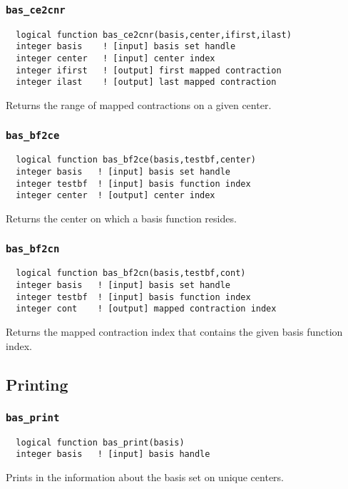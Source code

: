 \subsubsection{{\tt bas\_ce2cnr}}
\begin{verbatim}
  logical function bas_ce2cnr(basis,center,ifirst,ilast)
  integer basis    ! [input] basis set handle         
  integer center   ! [input] center index 
  integer ifirst   ! [output] first mapped contraction
  integer ilast    ! [output] last mapped contraction
\end{verbatim}
Returns the range of mapped contractions on a given center.

\subsubsection{{\tt bas\_bf2ce}}
\begin{verbatim}
  logical function bas_bf2ce(basis,testbf,center)
  integer basis   ! [input] basis set handle         
  integer testbf  ! [input] basis function index
  integer center  ! [output] center index
\end{verbatim}
Returns the center on which a basis function resides.

\subsubsection{{\tt bas\_bf2cn}}
\begin{verbatim}
  logical function bas_bf2cn(basis,testbf,cont)
  integer basis   ! [input] basis set handle         
  integer testbf  ! [input] basis function index
  integer cont    ! [output] mapped contraction index
\end{verbatim}
Returns the mapped contraction index that contains the given basis
function index.

\subsection{Printing}

\subsubsection{{\tt bas\_print}}
\begin{verbatim}
  logical function bas_print(basis)
  integer basis   ! [input] basis handle
\end{verbatim}
Prints in the information about the basis set on unique centers.

